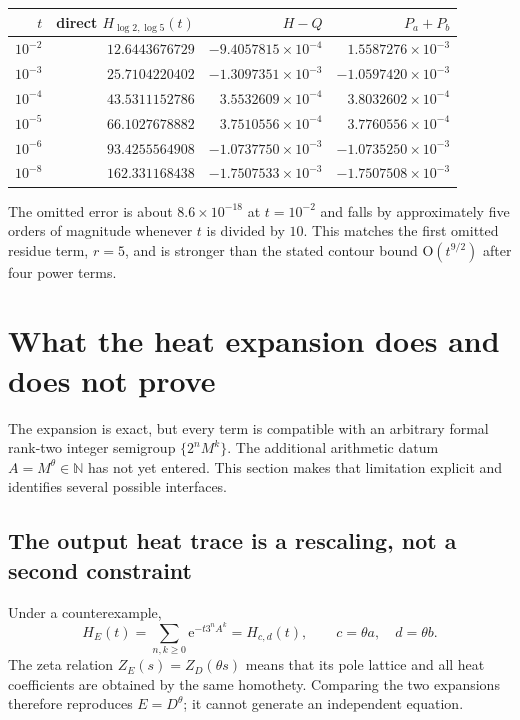 \documentclass[11pt,oneside]{article}
\theoremstyle{definition}
\theoremstyle{remark}
\newcommand{\N}{\mathbb N}
\newcommand{\e}{\mathrm e}
\newcommand{\bigO}{\mathrm O}
\begin{document}
\begin{center}
\begin{tabular}{rrrr}
\toprule
$t$ & direct $H_{\log2,\log5}(t)$ & $H-Q$ & $P_a+P_b$ \\
\midrule
$10^{-2}$ & $12.6443676729$ & $-9.4057815\!\times10^{-4}$ & $1.5587276\!\times10^{-3}$ \\
$10^{-3}$ & $25.7104220402$ & $-1.3097351\!\times10^{-3}$ & $-1.0597420\!\times10^{-3}$ \\
$10^{-4}$ & $43.5311152786$ & $ 3.5532609\!\times10^{-4}$ & $ 3.8032602\!\times10^{-4}$ \\
$10^{-5}$ & $66.1027678882$ & $ 3.7510556\!\times10^{-4}$ & $ 3.7760556\!\times10^{-4}$ \\
$10^{-6}$ & $93.4255564908$ & $-1.0737750\!\times10^{-3}$ & $-1.0735250\!\times10^{-3}$ \\
$10^{-8}$ & $162.331168438$ & $-1.7507533\!\times10^{-3}$ & $-1.7507508\!\times10^{-3}$ \\
\bottomrule
\end{tabular}
\end{center}

The omitted error is about $8.6\times10^{-18}$ at $t=10^{-2}$ and falls by approximately five orders of magnitude whenever $t$ is divided by $10$.  This matches the first omitted residue term, $r=5$, and is stronger than the stated contour bound $\bigO(t^{9/2})$ after four power terms.

\section{What the heat expansion does and does not prove}
\label{sec:heat-audit}

The expansion is exact, but every term is compatible with an arbitrary formal rank-two integer semigroup $\{2^nM^k\}$.  The additional arithmetic datum $A=M^\theta\in\N$ has not yet entered.  This section makes that limitation explicit and identifies several possible interfaces.

\subsection{The output heat trace is a rescaling, not a second constraint}

Under a counterexample,
\[
 H_E(t)=\sum_{n,k\ge0}\e^{-t3^nA^k}
       =H_{c,d}(t),
 \qquad c=\theta a,\quad d=\theta b.
\]
The zeta relation $Z_E(s)=Z_D(\theta s)$ means that its pole lattice and all heat coefficients are obtained by the same homothety.  Comparing the two expansions therefore reproduces $E=D^\theta$; it cannot generate an independent equation.
\end{document}
